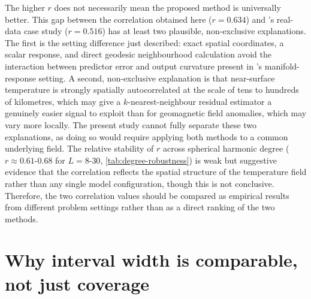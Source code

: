 \documentclass[11pt,a4paper]{report}
\begin{document}
The higher $r$ does not necessarily mean the proposed method is universally better. This gap between the correlation obtained here ($r = 0.634$) and \citeauthor{amirishahbazi2026}'s real-data case study ($r = 0.516$) has at least two plausible, non-exclusive explanations. The first is the setting difference just described: exact spatial coordinates, a scalar response, and direct geodesic neighbourhood calculation avoid the interaction between predictor error and output curvature present in \citeauthor{amirishahbazi2026}'s manifold-response setting. A second, non-exclusive explanation is that near-surface temperature is strongly spatially autocorrelated at the scale of tens to hundreds of kilometres, which may give a $k$-nearest-neighbour residual estimator a genuinely easier signal to exploit than for geomagnetic field anomalies, which may vary more locally. The present study cannot fully separate these two explanations, as doing so would require applying both methods to a common underlying field. The relative stability of $r$ across spherical harmonic degree ($r \approx 0.61$-$0.68$ for $L = 8$-$30$, \cref{tab:degree-robustness}) is weak but suggestive evidence that the correlation reflects the spatial structure of the temperature field rather than any single model configuration, though this is not conclusive. Therefore, the two correlation values should be compared as empirical results from different problem settings rather than as a direct ranking of the two methods.
 
\section{Why interval width is comparable, not just coverage}
\end{document}
